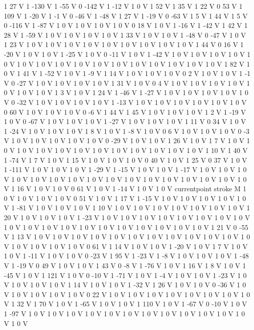 {{1 27 V
1 -130 V
1 -55 V
0 -142 V
1 -12 V
1 0 V
1 52 V
1 35 V
1 22 V
0 53 V
1 109 V
1 -20 V
1 -1 V
0 -46 V
1 -48 V
1 27 V
1 -19 V
0 -63 V
1 5 V
1 44 V
1 5 V
0 -116 V
1 -87 V
1 0 V
1 0 V
1 0 V
1 0 V
0 18 V
1 0 V
1 -16 V
1 -42 V
1 42 V
1 28 V
1 -59 V
1 0 V
1 0 V
1 0 V
1 0 V
1 33 V
1 0 V
1 0 V
1 -48 V
0 -47 V
1 0 V
1 23 V
1 0 V
1 0 V
1 0 V
1 0 V
1 0 V
1 0 V
1 0 V
1 0 V
1 0 V
1 44 V
0 16 V
1 -20 V
1 0 V
1 0 V
1 -25 V
1 0 V
0 -11 V
1 0 V
1 -42 V
1 0 V
1 0 V
1 0 V
1 0 V
1 0 V
1 0 V
1 0 V
1 0 V
1 0 V
1 0 V
1 0 V
1 0 V
1 0 V
1 0 V
1 0 V
1 0 V
1 82 V
1 0 V
1 41 V
1 -52 V
1 0 V
1 -9 V
1 14 V
1 0 V
1 0 V
1 0 V
0 2 V
1 0 V
1 0 V
1 -1 V
0 -27 V
1 0 V
1 0 V
1 0 V
1 0 V
1 31 V
1 0 V
0 4 V
1 0 V
1 0 V
1 0 V
1 0 V
1 0 V
1 0 V
1 0 V
1 3 V
1 0 V
1 24 V
1 -46 V
1 -27 V
1 0 V
1 0 V
1 0 V
1 0 V
1 0 V
0 -32 V
1 0 V
1 0 V
1 0 V
1 0 V
1 -13 V
1 0 V
1 0 V
1 0 V
1 0 V
1 0 V
1 0 V
0 60 V
1 0 V
1 0 V
1 0 V
0 -6 V
1 44 V
1 45 V
1 0 V
1 0 V
1 0 V
1 2 V
1 -19 V
1 0 V
0 -67 V
1 0 V
1 0 V
1 0 V
1 -27 V
1 0 V
1 0 V
1 0 V
1 11 V
0 34 V
1 0 V
1 -24 V
1 0 V
1 0 V
1 0 V
1 8 V
1 0 V
1 -8 V
1 0 V
0 6 V
1 0 V
1 0 V
1 0 V
0 -3 V
1 0 V
1 0 V
1 0 V
1 0 V
1 0 V
0 -29 V
1 0 V
1 0 V
1 26 V
1 0 V
1 7 V
1 0 V
1 0 V
1 0 V
1 0 V
1 0 V
1 0 V
1 0 V
1 0 V
1 0 V
1 0 V
1 0 V
1 0 V
1 10 V
1 40 V
1 -74 V
1 7 V
1 0 V
1 15 V
1 0 V
1 0 V
1 0 V
0 40 V
1 0 V
1 25 V
0 37 V
1 0 V
1 -111 V
1 0 V
1 0 V
1 0 V
1 -29 V
1 -15 V
1 0 V
1 0 V
1 -17 V
1 0 V
1 0 V
1 0 V
1 0 V
1 0 V
1 0 V
1 0 V
1 0 V
1 0 V
1 0 V
1 0 V
1 0 V
1 0 V
1 0 V
1 0 V
1 0 V
1 16 V
1 0 V
1 0 V
0 61 V
1 0 V
1 -14 V
1 0 V
1 0 V
currentpoint stroke M
1 0 V
1 0 V
1 0 V
1 0 V
0 51 V
1 0 V
1 17 V
1 -15 V
1 0 V
1 0 V
1 0 V
1 0 V
1 0 V
1 -81 V
1 0 V
1 0 V
1 0 V
1 10 V
1 0 V
1 0 V
1 0 V
1 0 V
1 0 V
1 0 V
1 0 V
1 20 V
1 0 V
1 0 V
1 0 V
1 -23 V
1 0 V
1 0 V
1 0 V
1 0 V
1 0 V
1 0 V
1 0 V
1 0 V
1 0 V
1 0 V
1 0 V
1 0 V
1 0 V
1 0 V
1 0 V
1 0 V
1 0 V
1 0 V
1 0 V
1 21 V
0 -55 V
1 13 V
1 0 V
1 0 V
1 0 V
1 0 V
1 0 V
1 0 V
1 0 V
1 0 V
1 0 V
1 0 V
1 0 V
1 0 V
1 0 V
1 0 V
1 0 V
1 0 V
0 61 V
1 14 V
1 0 V
1 0 V
1 -20 V
1 0 V
1 7 V
1 0 V
1 0 V
1 -11 V
1 0 V
1 0 V
0 -23 V
1 95 V
1 -23 V
1 -8 V
1 0 V
1 0 V
1 0 V
1 -48 V
1 -19 V
0 49 V
1 0 V
1 0 V
1 43 V
0 -8 V
1 -76 V
1 0 V
1 16 V
1 8 V
1 0 V
1 -45 V
1 0 V
1 121 V
1 0 V
0 -10 V
1 -71 V
1 0 V
1 -4 V
1 0 V
1 0 V
1 -23 V
1 0 V
1 0 V
1 0 V
1 0 V
1 14 V
1 0 V
1 0 V
1 -32 V
1 26 V
1 0 V
1 0 V
0 -36 V
1 0 V
1 0 V
1 0 V
1 0 V
1 0 V
0 22 V
1 0 V
1 0 V
1 0 V
1 0 V
1 0 V
1 0 V
1 0 V
1 0 V
1 32 V
1 70 V
1 0 V
1 -65 V
1 0 V
1 0 V
1 110 V
1 0 V
1 -67 V
0 -10 V
1 0 V
1 -97 V
1 0 V
1 0 V
1 0 V
1 0 V
1 0 V
1 0 V
1 0 V
1 0 V
1 0 V
1 0 V
1 0 V
1 0 V
1 0 V
}}
